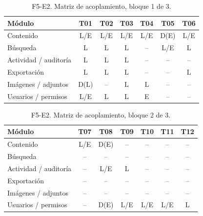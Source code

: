 \begin{table}[H]
\centering\small
\begin{tabularx}{\textwidth}{Xcccccc}
\toprule
\textbf{Módulo} & T01 & T02 & T03 & T04 & T05 & T06 \\
\midrule

Contenido & L/E & L/E & L/E & L/E & D(E) & L/E \\

Búsqueda & L & L & L & -- & L/E & L \\

Actividad / auditoría & L & L & L & -- & -- & -- \\

Exportación & L & L & L & -- & -- & L \\

Imágenes / adjuntos & D(L) & -- & L & L & -- & -- \\

Usuarios / permisos & L/E & L & L & E & -- & -- \\

\bottomrule
\end{tabularx}
\caption{F5-E2. Matriz de acoplamiento, bloque 1 de 3.}
\label{tab:f5-matriz-1}
\end{table}

\begin{table}[H]
\centering\small
\begin{tabularx}{\textwidth}{Xcccccc}
\toprule
\textbf{Módulo} & T07 & T08 & T09 & T10 & T11 & T12 \\
\midrule

Contenido & L/E & D(E) & -- & -- & -- & -- \\

Búsqueda & -- & -- & -- & -- & -- & -- \\

Actividad / auditoría & -- & L/E & L & -- & -- & -- \\

Exportación & -- & -- & -- & -- & -- & -- \\

Imágenes / adjuntos & -- & -- & -- & -- & -- & -- \\

Usuarios / permisos & -- & D(E) & L/E & L/E & L/E & L \\

\bottomrule
\end{tabularx}
\caption{F5-E2. Matriz de acoplamiento, bloque 2 de 3.}
\label{tab:f5-matriz-2}
\end{table}

